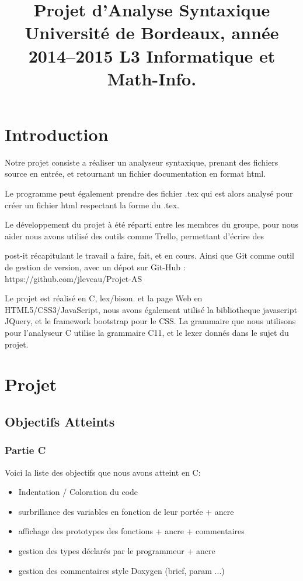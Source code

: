 \documentclass{report}
\title{Projet d’Analyse Syntaxique Université de Bordeaux, année 2014–2015 L3 Informatique et Math-Info.}
\begin{document}
\maketitle
\tableofcontents
\part{Introduction}
Notre projet consiste a réaliser un analyseur syntaxique, prenant des fichiers source en entrée, et retournant un fichier documentation en format html.

Le programme peut également prendre des fichier .tex qui est alors analysé pour créer un fichier html respectant la forme du .tex.

Le développement du projet à été réparti entre les membres du groupe, pour nous aider nous avons utilisé des outils comme Trello, permettant d'écrire des 

post-it récapitulant le travail a faire, fait, et en cours. Ainsi que Git comme outil de gestion de version, avec un dépot sur Git-Hub : https://github.com/jleveau/Projet-AS

Le projet est réalisé en C, lex/bison. et la page Web en HTML5/CSS3/JavaScript, nous avons également utilisé la bibliotheque javascript JQuery, et le framework bootstrap pour le CSS. La grammaire que nous utilisons pour l'analyseur C utilise la grammaire C11, et le lexer donnés dans le sujet du projet.
\part{Projet}
\chapter{Objectifs Atteints}
\section{Partie C}
Voici la liste des objectifs que nous avons atteint en C:
\begin{itemize}
\item Indentation / Coloration du code
\item surbrillance des variables en fonction de leur portée + ancre
\item affichage des prototypes des fonctions + ancre + commentaires
\item gestion des types déclarés par le programmeur + ancre
\item gestion des commentaires style Doxygen (brief, param ...)
\end{itemize}
\end{document}
